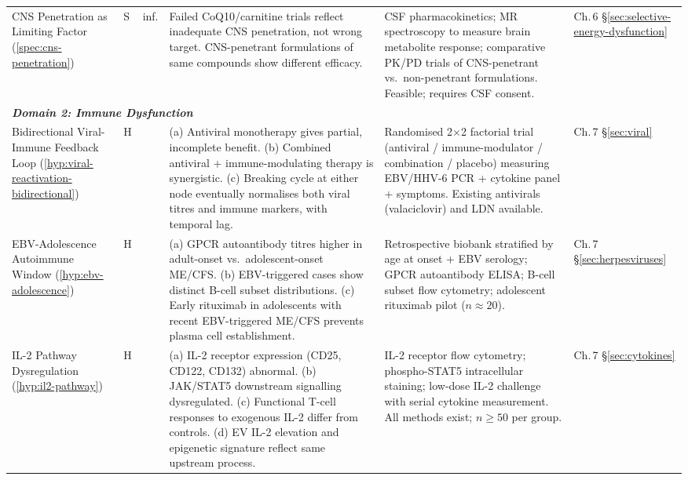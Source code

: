 \begin{longtable}{%
  p{3.0cm}
  >{\centering\arraybackslash}p{0.55cm}
  >{\centering\arraybackslash}p{1.0cm}
  p{3.8cm}
  p{3.8cm}
  p{2.2cm}
}
CNS Penetration as Limiting Factor
(\ref{spec:cns-penetration})
&
S & inf.
&
Failed CoQ10/carnitine trials reflect inadequate CNS penetration, not wrong
target.
CNS-penetrant formulations of same compounds show different efficacy.
&
CSF pharmacokinetics; MR spectroscopy to measure brain metabolite response;
comparative PK/PD trials of CNS-penetrant vs.\ non-penetrant formulations.
Feasible; requires CSF consent.
&
Ch.\,6 \S\ref{sec:selective-energy-dysfunction} \\[6pt]

\multicolumn{6}{l}{\small\textit{\textbf{Domain 2: Immune Dysfunction}}} \\[2pt]

Bidirectional Viral-Immune Feedback Loop
(\ref{hyp:viral-reactivation-bidirectional})
&
H & 0.50
&
(a) Antiviral monotherapy gives partial, incomplete benefit.
(b) Combined antiviral + immune-modulating therapy is synergistic.
(c) Breaking cycle at either node eventually normalises both viral titres and
immune markers, with temporal lag.
&
Randomised 2$\times$2 factorial trial (antiviral / immune-modulator /
combination / placebo) measuring EBV/HHV-6 PCR + cytokine panel + symptoms.
Existing antivirals (valaciclovir) and LDN available.
&
Ch.\,7 \S\ref{sec:viral} \\[6pt]

EBV-Adolescence Autoimmune Window
(\ref{hyp:ebv-adolescence})
&
H & 0.50
&
(a) GPCR autoantibody titres higher in adult-onset vs.\ adolescent-onset ME/CFS.
(b) EBV-triggered cases show distinct B-cell subset distributions.
(c) Early rituximab in adolescents with recent EBV-triggered ME/CFS prevents
plasma cell establishment.
&
Retrospective biobank stratified by age at onset + EBV serology;
GPCR autoantibody ELISA; B-cell subset flow cytometry;
adolescent rituximab pilot ($n \approx 20$).
&
Ch.\,7 \S\ref{sec:herpesviruses} \\[6pt]

IL-2 Pathway Dysregulation
(\ref{hyp:il2-pathway})
&
H & 0.45
&
(a) IL-2 receptor expression (CD25, CD122, CD132) abnormal.
(b) JAK/STAT5 downstream signalling dysregulated.
(c) Functional T-cell responses to exogenous IL-2 differ from controls.
(d) EV IL-2 elevation and epigenetic signature reflect same upstream process.
&
IL-2 receptor flow cytometry; phospho-STAT5 intracellular staining;
low-dose IL-2 challenge with serial cytokine measurement.
All methods exist; $n \geq 50$ per group.
&
Ch.\,7 \S\ref{sec:cytokines} \\[6pt]


\end{longtable}
